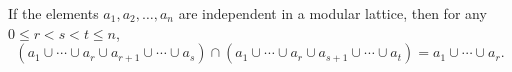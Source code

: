 If the elements $a_1, a_2, \dots, a_n$ are independent in a modular lattice, then for any $0 \leq r < s < t \leq n$,
$$(a_1 \cup \cdots \cup a_r \cup a_{r+1} \cup \cdots \cup a_s) \cap (a_1 \cup \cdots \cup a_r \cup a_{s+1} \cup \cdots \cup a_t) = a_1 \cup \cdots \cup a_r.$$
